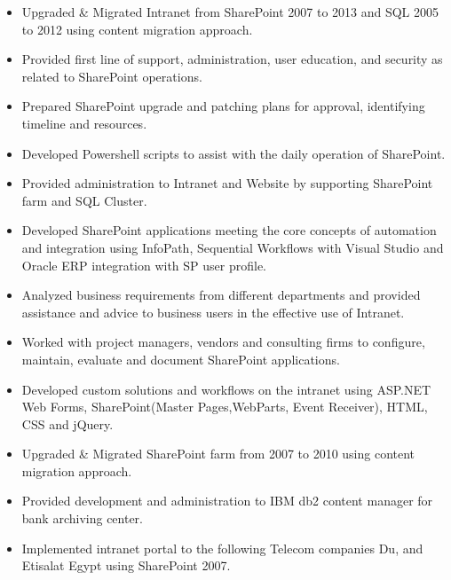 

\begin{itemize}
\item Upgraded \& Migrated Intranet from SharePoint 2007 to 2013 and SQL 2005 to 2012 using content migration approach.
\item Provided first line of support, administration, user education, and security as related to SharePoint operations.
\item Prepared SharePoint upgrade and patching plans for approval, identifying timeline and resources. 
\item Developed Powershell scripts to assist with the daily operation of SharePoint.
\item Provided administration to Intranet and Website by supporting SharePoint farm and SQL Cluster.
\item Developed SharePoint applications meeting the core concepts of automation and integration using InfoPath, Sequential Workflows with Visual Studio and Oracle ERP integration with SP user profile.

\end{itemize}

\divider

\begin {itemize}
\item 	Analyzed business requirements from different departments and provided assistance and advice to business users in the effective use of Intranet.
\item Worked with project managers, vendors and consulting firms to configure, maintain, evaluate and document SharePoint applications.
\item 	Developed custom solutions and workflows on the intranet using ASP.NET Web Forms, SharePoint(Master Pages,WebParts, Event Receiver), HTML, CSS and jQuery.
\item Upgraded \& Migrated SharePoint farm from 2007 to 2010 using content migration approach. 
\item 	Provided development and administration to IBM db2 content manager for bank archiving center.

\end{itemize}
\divider

\begin{itemize}
\item Implemented intranet portal to the following Telecom companies Du, and Etisalat Egypt using SharePoint 2007.
\end{itemize}
